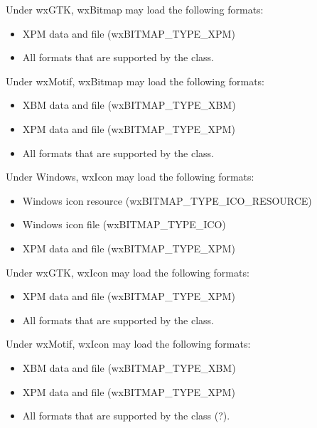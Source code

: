 Under wxGTK, wxBitmap may load the following formats:

\begin{itemize}\itemsep=0pt
\item XPM data and file (wxBITMAP\_TYPE\_XPM)
\item All formats that are supported by the  class.
\end{itemize}

Under wxMotif, wxBitmap may load the following formats:

\begin{itemize}\itemsep=0pt
\item XBM data and file (wxBITMAP\_TYPE\_XBM)
\item XPM data and file (wxBITMAP\_TYPE\_XPM)
\item All formats that are supported by the  class.
\end{itemize}


Under Windows, wxIcon may load the following formats:

\begin{itemize}\itemsep=0pt
\item Windows icon resource (wxBITMAP\_TYPE\_ICO\_RESOURCE)
\item Windows icon file (wxBITMAP\_TYPE\_ICO)
\item XPM data and file (wxBITMAP\_TYPE\_XPM)
\end{itemize}

Under wxGTK, wxIcon may load the following formats:

\begin{itemize}\itemsep=0pt
\item XPM data and file (wxBITMAP\_TYPE\_XPM)
\item All formats that are supported by the  class.
\end{itemize}

Under wxMotif, wxIcon may load the following formats:

\begin{itemize}\itemsep=0pt
\item XBM data and file (wxBITMAP\_TYPE\_XBM)
\item XPM data and file (wxBITMAP\_TYPE\_XPM)
\item All formats that are supported by the  class (?).
\end{itemize}

